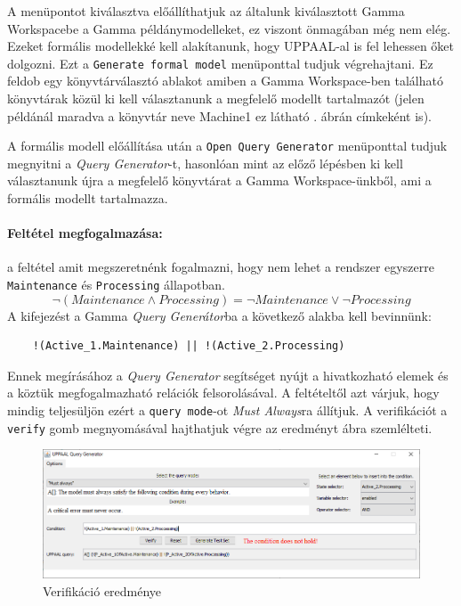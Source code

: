 A menüpontot kiválasztva előállíthatjuk az általunk kiválasztott Gamma Workspacebe a Gamma példánymodelleket, ez viszont önmagában még nem elég. Ezeket formális modellekké kell alakítanunk, hogy UPPAAL-al is fel lehessen őket dolgozni. Ezt a \verb+Generate formal model+ menüponttal tudjuk végrehajtani. Ez feldob egy könyvtárválasztó ablakot amiben a Gamma Workspace-ben található könyvtárak közül ki kell választanunk a megfelelő modellt tartalmazót (jelen példánál maradva a könyvtár neve Machine1 ez látható . ábrán címkeként is).

A formális modell előállítása után a \verb+Open Query Generator+ menüponttal tudjuk megnyitni a \emph{Query Generator}-t, hasonlóan mint az előző lépésben ki kell választanunk újra a megfelelő könyvtárat a Gamma Workspace-ünkből, ami a formális modellt tartalmazza.

\paragraph{Feltétel megfogalmazása: } a feltétel amit megszeretnénk fogalmazni, hogy nem lehet a rendszer egyszerre \verb+Maintenance+ és \verb+Processing+ állapotban.
\[ \neg(Maintenance  \land Processing) = \neg Maintenance \lor \neg Processing \]
A kifejezést a Gamma \emph{Query Generátor}ba a következő alakba kell bevinnünk:
\begin{lstlisting}
	!(Active_1.Maintenance) || !(Active_2.Processing)
\end{lstlisting}
Ennek megírásához a \emph{Query Generator} segítséget nyújt a hivatkozható elemek és a köztük megfogalmazható relációk felsorolásával. A feltételtől azt várjuk, hogy mindig teljesüljön ezért a \verb+query mode+-ot \emph{Must Always}ra állítjuk. A verifikációt a \verb+verify+ gomb megnyomásával hajthatjuk végre az eredményt   ábra szemlélteti.
\begin{figure}[H]
	\centering
	\includegraphics[keepaspectratio, width=150mm]{figures/query-gen-result.png}
	\caption{Verifikáció eredménye}
	\label{fig:query-gen-res}
\end{figure}

